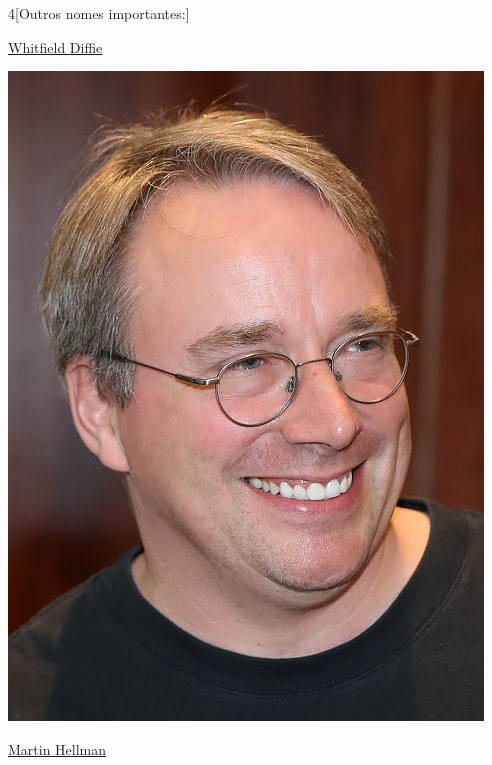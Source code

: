 \begin{multicols}{4}[Outros nomes importantes:]
\vfill\null
\columnbreak				
				
				\href{https://pt.wikipedia.org/wiki/Whitfield_Diffie}{Whitfield Diffie}
				
\begin{center}
					\includegraphics[width=.8\columnwidth]{./IMG-GIT/CIENTISTAS/linus.jpeg}
\end{center}
				
\vfill\null
\columnbreak				
				
				\href{https://pt.wikipedia.org/wiki/Martin_Hellman}{Martin Hellman}
				

\end{multicols}
